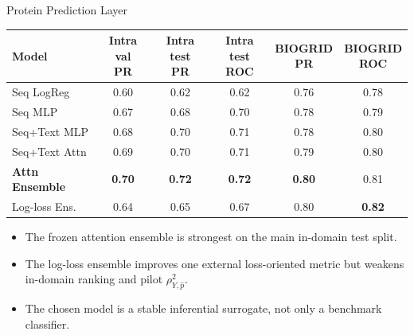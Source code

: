 \documentclass[aspectratio=169,10pt]{beamer}
\begin{document}
\begin{frame}{Protein Prediction Layer}
\begin{center}
\small
\begin{tabular}{lccccc}
\toprule
Model & \makecell{Intra val\\PR} & \makecell{Intra test\\PR} & \makecell{Intra test\\ROC} & \makecell{BIOGRID\\PR} & \makecell{BIOGRID\\ROC}\\
\midrule
Seq LogReg & 0.60 & 0.62 & 0.62 & 0.76 & 0.78\\
Seq MLP & 0.67 & 0.68 & 0.70 & 0.78 & 0.79\\
Seq+Text MLP & 0.68 & 0.70 & 0.71 & 0.78 & 0.80\\
Seq+Text Attn & 0.69 & 0.70 & 0.71 & 0.79 & 0.80\\
\textbf{Attn Ensemble} & \textbf{0.70} & \textbf{0.72} & \textbf{0.72} & \textbf{0.80} & 0.81\\
Log-loss Ens. & 0.64 & 0.65 & 0.67 & 0.80 & \textbf{0.82}\\
\bottomrule
\end{tabular}
\end{center}

\vspace{0.15cm}
\begin{itemize}
  \item The frozen attention ensemble is strongest on the main in-domain test split.
  \item The log-loss ensemble improves one external loss-oriented metric but weakens in-domain ranking and pilot \(\rho^2_{Y,\hat p}\).
  \item The chosen model is a stable inferential surrogate, not only a benchmark classifier.
\end{itemize}
\end{frame}
\end{document}

